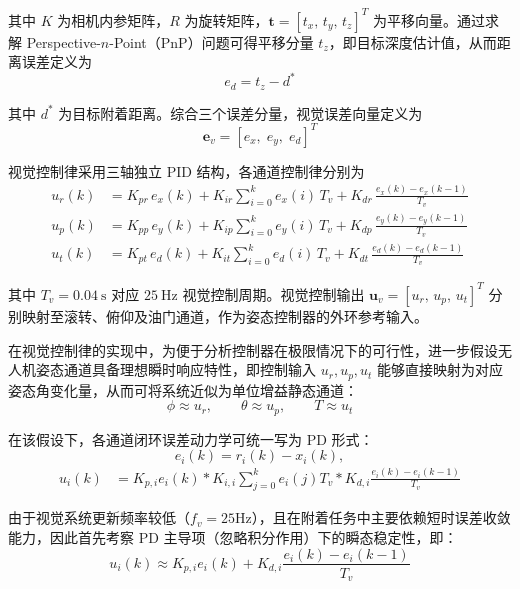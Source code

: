 其中 $K$ 为相机内参矩阵，$R$ 为旋转矩阵，$\mathbf{t} = [t_x,\,t_y,\,t_z]^T$ 为平移向量。通过求解 Perspective-$n$-Point（PnP）问题可得平移分量 $t_z$，即目标深度估计值，从而距离误差定义为
\begin{equation}
    e_d = t_z - d^*
\end{equation}

其中 $d^*$ 为目标附着距离。综合三个误差分量，视觉误差向量定义为
\begin{equation}
    \mathbf{e}_v = [e_x,\;e_y,\;e_d]^T
\end{equation}

视觉控制律采用三轴独立 PID 结构，各通道控制律分别为
\begin{align}
    u_r(k) &= K_{pr}\,e_x(k)
             + K_{ir}\sum_{i=0}^{k}e_x(i)\,T_v
             + K_{dr}\,\frac{e_x(k)-e_x(k-1)}{T_v} \\[4pt]
    u_p(k) &= K_{pp}\,e_y(k)
             + K_{ip}\sum_{i=0}^{k}e_y(i)\,T_v
             + K_{dp}\,\frac{e_y(k)-e_y(k-1)}{T_v} \\[4pt]
    u_t(k) &= K_{pt}\,e_d(k)
             + K_{it}\sum_{i=0}^{k}e_d(i)\,T_v
             + K_{dt}\,\frac{e_d(k)-e_d(k-1)}{T_v}
\end{align}

其中 $T_v = 0.04\ \mathrm{s}$ 对应 $25\ \mathrm{Hz}$ 视觉控制周期。视觉控制输出 $\mathbf{u}_v = [u_r,\,u_p,\,u_t]^T$ 分别映射至滚转、俯仰及油门通道，作为姿态控制器的外环参考输入。

在视觉控制律的实现中，为便于分析控制器在极限情况下的可行性，进一步假设无人机姿态通道具备理想瞬时响应特性，即控制输入 $u_r,u_p,u_t$ 能够直接映射为对应姿态角变化量，从而可将系统近似为单位增益静态通道：
\begin{equation}
\phi \approx u_r,\qquad
\theta \approx u_p,\qquad
T \approx u_t
\end{equation}

在该假设下，各通道闭环误差动力学可统一写为 PD 形式：
\begin{equation}
e_i(k) = r_i(k) - x_i(k),
\end{equation}
\begin{align}
u_i(k)
&= K_{p,i} e_i(k)
* K_{i,i} \sum_{j=0}^{k} e_i(j) T_v
* K_{d,i} \frac{e_i(k)-e_i(k-1)}{T_v}
\end{align}

由于视觉系统更新频率较低（$f_v=25 \mathrm{Hz}$），且在附着任务中主要依赖短时误差收敛能力，因此首先考察 PD 主导项（忽略积分作用）下的瞬态稳定性，即：
\begin{equation}
u_i(k)
\approx
K_{p,i} e_i(k)
+
K_{d,i} \frac{e_i(k)-e_i(k-1)}{T_v}
\end{equation}

